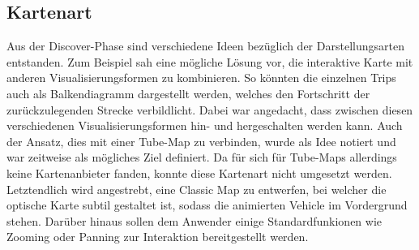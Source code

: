 \subsection{Kartenart}
\label{ssub:kartenart}
  Aus der Discover-Phase sind verschiedene Ideen bezüglich der Darstellungsarten entstanden. Zum Beispiel sah eine mögliche Lösung vor, die interaktive Karte mit anderen Visualisierungsformen zu kombinieren. So könnten die einzelnen Trips auch als Balkendiagramm dargestellt werden, welches den Fortschritt der zurückzulegenden Strecke verbildlicht. Dabei war angedacht, dass zwischen diesen verschiedenen Visualisierungsformen hin- und hergeschalten werden kann. Auch der Ansatz, dies mit einer Tube-Map zu verbinden, wurde als Idee notiert und war zeitweise als mögliches Ziel definiert. Da für sich für Tube-Maps allerdings keine Kartenanbieter fanden, konnte diese Kartenart nicht umgesetzt werden.
  Letztendlich wird angestrebt, eine Classic Map zu entwerfen, bei welcher die optische Karte subtil gestaltet ist, sodass die animierten Vehicle im Vordergrund stehen. Darüber hinaus sollen dem Anwender einige Standardfunkionen wie Zooming oder Panning zur Interaktion bereitgestellt werden. 

